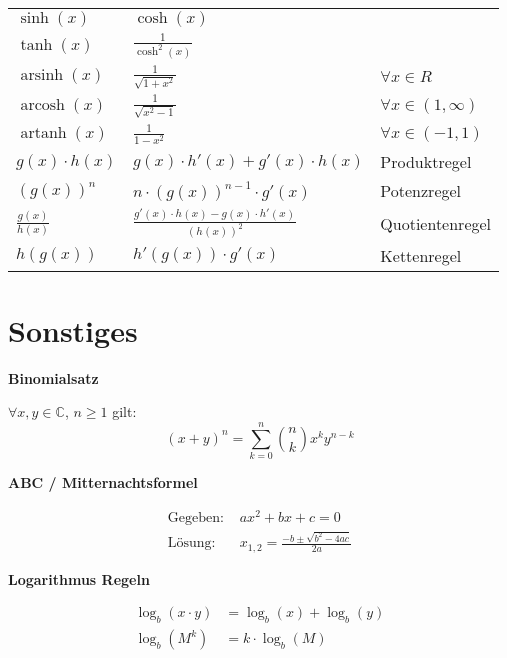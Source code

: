 \documentclass[25pt]{sciposter}
\newenvironment{method}[1]{\begin{mdframed}[backgroundcolor=blue!10,innertopmargin=15pt, innerbottommargin=15pt]
		\textbf{#1 }
	}
	{ 
	\end{mdframed}
}
\begin{document}
\begin{multicols}{3}
{\begin{table}[]
\begin{tabular}{@{} p{} p{} p{} @{}}
			$\sinh(x)$ & $\cosh(x)$ & \\
			$\tanh(x)$ & $\frac{1}{\cosh^2(x)}$ & \\
			$\operatorname{arsinh}(x)$ & $\frac{1}{\sqrt{1+x^2}}$ & $\forall x \in R$\\
			$\operatorname{arcosh}(x)$ & $\frac{1}{\sqrt{x^2 - 1}}$ & $\forall x \in (1, \infty)$\\		  $\operatorname{artanh}(x)$ & $\frac{1}{1-x^2}$ & $\forall x \in (-1,1)$\\
			\midrule
			$g(x) \cdot h(x)$ & $g(x) \cdot h'(x) + g'(x) \cdot h(x)$ & Produktregel\\
			$\left(g(x)\right)^n$ & $n \cdot \left( g(x) \right)^{n-1} \cdot g'(x)$ & Potenzregel\\
			$\frac{g(x)}{h(x)}$ & $\frac{ g'(x) \cdot h(x) - g(x)\cdot h'(x)}{\left(h(x)\right) ^2}$ & Quotientenregel\\
			$h(g(x))$ & $h'(g(x)) \cdot g'(x)$ & Kettenregel\\
			\bottomrule
		\end{tabular}
	\end{table}
}











\section*{Sonstiges}
\begin{method}{Binomialsatz}
	$\forall x,y \in \mathbb{C}$, $n \geq 1$ gilt:
	$$(x+y)^n = \sum_{k=0}^{n} \binom{n}{k}x^k y^{n-k}$$
\end{method}

\begin{method}{ABC / Mitternachtsformel}
	\begin{align*}
	\text{Gegeben: } & ax^2 + bx + c = 0\\
	\text{Lösung: } & x_{1,2} = \frac{-b \pm \sqrt{b^2 -4ac}}{2a}
	\end{align*}
\end{method}


\begin{method}{Logarithmus Regeln}
\begin{align*}
	 \log _{b}(x\cdot y) &= \log _{b}(x)+\log _{b}(y)\\
	 \log_{b} (M^k) &= k \cdot \log_b (M)
\end{align*}
\end{method}



\end{multicols}
\end{document}
